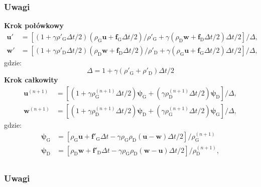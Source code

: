 \documentclass{beamer}
\begin{document}
\begin{frame}
\frametitle{Uwagi}
{\scriptsize
\textbf{Krok połówkowy}
\begin{align}
\mathbf{u}' &= 
\left[
   \left(1 + \gamma\rho'_{\textrm{G}}\Delta t / 2 \right)
   \left(\rho_{\textrm{G}}\mathbf{u} + \mathbf{f}_{\textrm{G}} \Delta t / 2 \right) / \rho'_{\textrm{G}}
   +\gamma \left( \rho_{\textrm{D}}\mathbf{w} + \mathbf{f}_{\textrm{D}}\Delta t / 2 \right) \Delta t / 2
\right] / \Delta, \\
\mathbf{w}' &= 
\left[
   \left(1 + \gamma\rho'_{\textrm{D}}\Delta t / 2 \right)
   \left(\rho_{\textrm{D}}\mathbf{w} + \mathbf{f}_{\textrm{D}} \Delta t / 2 \right) / \rho'_{\textrm{D}}
   +\gamma \left( \rho_{\textrm{G}}\mathbf{u} + \mathbf{f}_{\textrm{G}}\Delta t / 2 \right) \Delta t / 2
\right] / \Delta,
\end{align}
gdzie:
\begin{equation}
\Delta = 1 + \gamma(\rho'_{\textrm{G}} + \rho'_{\textrm{D}})\Delta t / 2
\end{equation}
\textbf{Krok całkowity}
\begin{align}
\mathbf{u}^{(n+1)} &=
\left[ 
  \left(1 + \gamma \rho_{\textrm{G}}^{(n+1)} \Delta t / 2 \right)\mathbf{\psi}_{\textrm{G}} +
       \left(\gamma \rho_{\textrm{D}}^{(n+1)} \Delta t / 2 \right)\mathbf{\psi}_{\textrm{D}}
\right] / \Delta,  \\
\mathbf{w}^{(n+1)} &= 
\left[ 
  \left(1 + \gamma \rho_{\textrm{D}}^{(n+1)} \Delta t / 2\right)\mathbf{\psi}_{\textrm{D}} +
  \left(  \gamma \rho_{\textrm{G}}^{(n+1)} \Delta t / 2\right) \mathbf{\psi}_{\textrm{G}}
\right] / \Delta,
\end{align}
gdzie:
\begin{align}
\mathbf{\psi}_{\textrm{G}} & = 
\left[
  \rho_{\textrm{G}} \mathbf{u} + \mathbf{f}'_{\textrm{G}}\Delta t - \gamma \rho_{\textrm{G}} \rho_{\textrm{D}} (\mathbf{u} - \mathbf{w}) \Delta t / 2
\right] / {\rho_{\textrm{G}}^{(n+1)}}  \\
\mathbf{\psi}_{\textrm{D}} & = 
\left[
  \rho_{\textrm{D}} \mathbf{w} + \mathbf{f}'_{\textrm{D}}\Delta t - \gamma \rho_{\textrm{G}} \rho_{\textrm{D}} (\mathbf{w} - \mathbf{u}) \Delta t / 2
\right] / {\rho_{\textrm{D}}^{(n+1)}},\\
\end{align}
}
\end{frame}

\begin{frame}
\frametitle{Uwagi}
\begin{columns}
   \begin{column}{0.5\textwidth}
      \begin{center}
      \end{center}
   \end{column}
   \begin{column}{0.5\textwidth}
      \begin{center}
      \end{center}
   \end{column}
\end{columns}
\end{frame}
\end{document}
